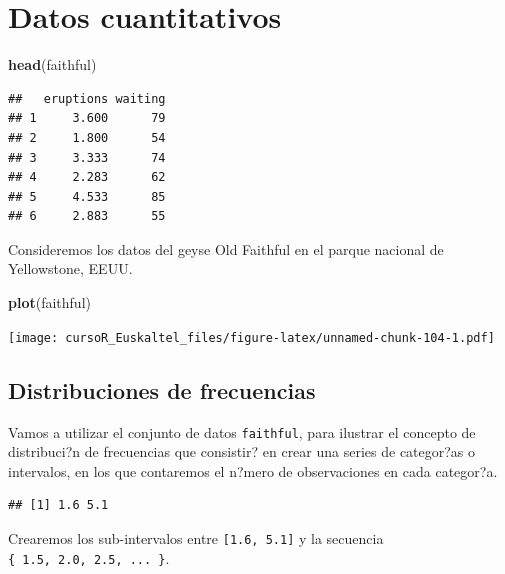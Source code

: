 \documentclass[]{book}
\newenvironment{Shaded}{\begin{snugshade}}{\end{snugshade}}
\newcommand{\KeywordTok}[1]{\textcolor[rgb]{0.13,0.29,0.53}{\textbf{#1}}}
\newcommand{\StringTok}[1]{\textcolor[rgb]{0.31,0.60,0.02}{#1}}
\newcommand{\OperatorTok}[1]{\textcolor[rgb]{0.81,0.36,0.00}{\textbf{#1}}}
\newcommand{\NormalTok}[1]{#1}
\begin{document}
\section{Datos cuantitativos}\label{datos-cuantitativos}

\begin{Shaded}
\begin{Highlighting}[]
\KeywordTok{head}\NormalTok{(faithful)}
\end{Highlighting}
\end{Shaded}

\begin{verbatim}
##   eruptions waiting
## 1     3.600      79
## 2     1.800      54
## 3     3.333      74
## 4     2.283      62
## 5     4.533      85
## 6     2.883      55
\end{verbatim}

Consideremos los datos del geyse Old Faithful en el parque nacional de
Yellowstone, EEUU.

\begin{Shaded}
\begin{Highlighting}[]
\KeywordTok{plot}\NormalTok{(faithful)}
\end{Highlighting}
\end{Shaded}

\texttt{[image: cursoR\_Euskaltel\_files/figure-latex/unnamed-chunk-104-1.pdf]}

\subsection{Distribuciones de
frecuencias}\label{distribuciones-de-frecuencias}

Vamos a utilizar el conjunto de datos \texttt{faithful}, para ilustrar
el concepto de distribuci?n de frecuencias que consistir? en crear una
series de categor?as o intervalos, en los que contaremos el n?mero de
observaciones en cada categor?a.

\begin{Shaded}
\end{Shaded}

\begin{verbatim}
## [1] 1.6 5.1
\end{verbatim}

Crearemos los sub-intervalos entre \texttt{{[}1.6,\ 5.1{]}} y la
secuencia \texttt{\{\ 1.5,\ 2.0,\ 2.5,\ ...\ \}}.
\end{document}
